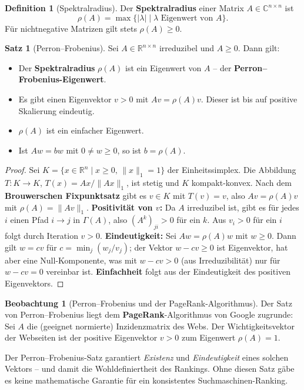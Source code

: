 ﻿\documentclass[a4paper,12pt]{report}
\theoremstyle{definition}
\newtheorem{definition}{Definition}
\newtheorem{satz}{Satz}
\newtheorem{beobachtung}{Beobachtung}
\begin{document}
\begin{definition}[Spektralradius]
    Der \textbf{Spektralradius} einer Matrix $A \in \mathbb{C}^{n \times n}$ ist
    \[
        \rho(A) = \max\{|\lambda| \mid \lambda \text{ Eigenwert von } A\}.
    \]
    Für nichtnegative Matrizen gilt stets $\rho(A) \geq 0$.
\end{definition}

\begin{satz}[Perron--Frobenius]
    Sei $A \in \mathbb{R}^{n \times n}$ irreduzibel und $A \geq 0$. Dann gilt:
    \begin{itemize}
        \item[-] Der \textbf{Spek\-tral\-radius} $\rho(A)$ ist ein Eigenwert
              von $A$ -- der \textbf{Perron--Fro\-benius-Eigen\-wert}.
        \item[-] Es gibt einen Eigenvektor $v > 0$ mit $Av = \rho(A) v$.
              Dieser ist bis auf positive Skalierung eindeutig.
        \item[-] $\rho(A)$ ist ein einfacher Eigenwert.
        \item[-] Ist $Aw = bw$ mit $0 \neq w \geq 0$, so ist $b = \rho(A)$.
    \end{itemize}
\end{satz}
\begin{proof}
    Sei $K = \{x \in \mathbb{R}^n \mid x \geq 0,\, \|x\|_1 = 1\}$ der
    Einheitssimplex. Die Abbildung $T : K \to K$, $T(x) = Ax/\|Ax\|_1$,
    ist stetig und $K$ kompakt-konvex. Nach dem \textbf{Brouwerschen Fixpunktsatz}
    gibt es $v \in K$ mit $T(v) = v$, also $Av = \rho(A) v$ mit $\rho(A) = \|Av\|_1$.
    \textbf{Positivität von $v$:} Da $A$ irreduzibel ist, gibt es für jedes $i$
    einen Pfad $i \to j$ in $\Gamma(A)$, also $(A^k)_{ji} > 0$ für ein $k$.
    Aus $v_i > 0$ für ein $i$ folgt durch Iteration $v > 0$.
    \textbf{Eindeutigkeit:} Sei $Aw = \rho(A) w$ mit $w \geq 0$.
    Dann gilt $w = cv$ für $c = \min_j(w_j/v_j)$; der Vektor $w - cv \geq 0$
    ist Eigenvektor, hat aber eine Null-Komponente, was mit $w - cv > 0$
    (aus Irreduzibilität) nur für $w - cv = 0$ vereinbar ist.
    \textbf{Einfachheit} folgt aus der Eindeutigkeit des positiven Eigenvektors.
\end{proof}

\begin{beobachtung}[Perron--Frobenius und der PageRank-Algorithmus]
    Der Satz von Perron--Frobenius liegt dem \textbf{PageRank}-Algorithmus
    von Google zugrunde: Sei $A$ die (geeignet normierte) Inzidenzmatrix des
    Webs. Der Wichtigkeitsvektor der Webseiten ist der positive Eigenvektor
    $v > 0$ zum Eigenwert $\rho(A) = 1$.

    Der Perron--Frobenius-Satz garantiert \emph{Existenz} und
    \emph{Eindeutigkeit} eines solchen Vektors -- und damit die
    Wohldefiniertheit des Rankings. Ohne diesen Satz gäbe es keine
    mathematische Garantie für ein konsistentes Suchmaschinen-Ranking.
\end{beobachtung}
\end{document}

